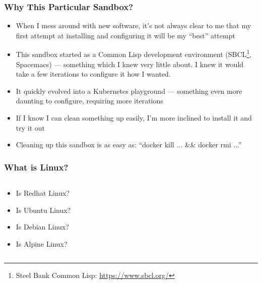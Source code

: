     \begin{frame}
      \frametitle{Why This Particular Sandbox?}
      \begin{itemize}
      \item<2->When I mess around with new software, it's not always clear to me that
        my first attempt at installing and configuring it will be my ``best'' attempt
      \item<3->This sandbox started as a Common Lisp development environment
        (SBCL\footnote<3->{Steel Bank Common Lisp: \href{https://www.sbcl.org/}{https://www.sbcl.org/}}, Spacemacs) --- something which I knew very little about. I knew
        it would take a few iterations to configure it how I wanted.
      \item<4->It quickly evolved into a Kubernetes playground --- something
        even more daunting to configure, requiring more iterations
      \item<5->If I know I can clean something up easily, I'm more inclined to
        install it and try it out
      \item<6->Cleaning up this sandbox is as easy as: ``docker kill ... \&\& docker rmi ...''
      \end{itemize}
    \end{frame}

    \begin{frame}
    \frametitle{What is Linux?}
    \begin{columns}
        \begin{column}{0.5\textwidth}
            \begin{itemize}
                \item<2->Is Redhat Linux?
                \item<3->Is Ubuntu Linux?
                \item<4->Is Debian Linux?
                \item<5->Is Alpine Linux?
            \end{itemize}
        \end{column}
        \begin{column}{0.5\textwidth}
          \begin{center}
          \end{center}
        \end{column}
    \end{columns}
    \end{frame}

